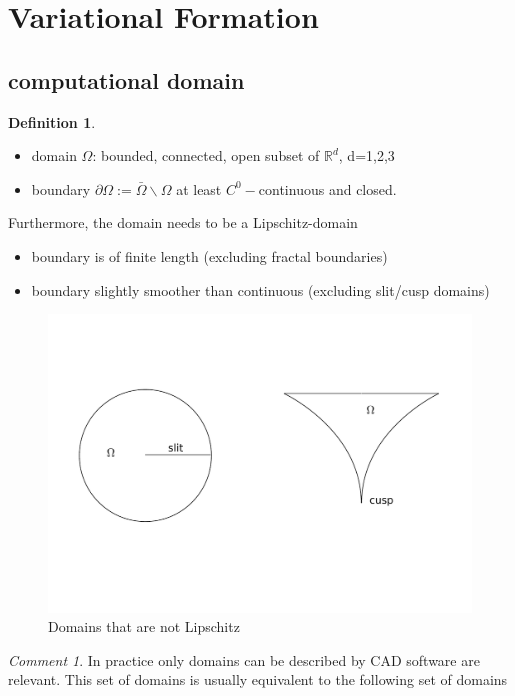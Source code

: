 \documentclass[english]{article}
\theoremstyle{definition}
\newtheorem*{defi}{Definition}
\theoremstyle{remark}
\newtheorem*{comm}{Comment}
\newcommand{\p}{\partial}
\newcommand{\RR}{\mathbb{R}}			%
\newcommand{\OO}{\Omega}
\begin{document}
\section{Variational Formation}
\subsection{computational domain}
\begin{defi}
  \begin{itemize}
  \item domain $\OO$: bounded, connected, open subset of $\RR^d$, d=1,2,3
  \item boundary $\p\OO:=\bar\OO \backslash \OO$ at least $C^0-$continuous and closed.
  \end{itemize}
  Furthermore, the domain needs to be a Lipschitz-domain
  \begin{itemize}
  \item boundary is of finite length (excluding fractal boundaries)
  \item boundary slightly smoother than continuous (excluding slit/cusp domains)
  \end{itemize}
\end{defi}

\begin{figure}[tbh]
  \begin{center}
    \includegraphics[width=\textwidth]{figs/notLipschitzDomain.pdf}
  \end{center}
  \caption{Domains that are not Lipschitz}
  \label{not-lipschitz-figure}
\end{figure}

\begin{comm}
  In practice only domains can be described by CAD software are relevant. This set of domains is usually equivalent to the following set of domains\end{comm}
\end{document}
